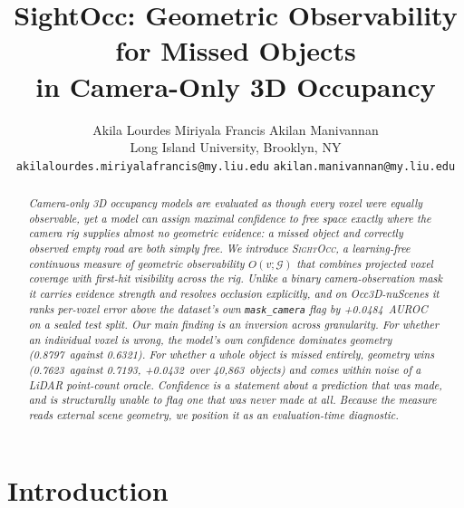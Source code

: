 \documentclass[10pt,twocolumn,letterpaper]{article}
\newcommand{\Hii}{+0.0484}
\newcommand{\objObs}{0.7623}
\newcommand{\objMSP}{0.7193}
\newcommand{\objDelta}{+0.0432}
\newcommand{\voxMSP}{0.8797}
\newcommand{\voxObs}{0.6321}
\newcommand{\nObj}{40{,}863}
\begin{document}
\title{SightOcc: Geometric Observability for Missed Objects\\
       in Camera-Only 3D Occupancy}

\author{%
Akila Lourdes Miriyala Francis \qquad Akilan Manivannan\\
Long Island University, Brooklyn, NY\\
{\tt\small akilalourdes.miriyalafrancis@my.liu.edu}\quad
{\tt\small akilan.manivannan@my.liu.edu}
}

\date{}
\maketitle

\begin{abstract}
\itshape
Camera-only 3D occupancy models are evaluated as though every voxel were
equally observable, yet a model can assign maximal confidence to free
space exactly where the camera rig supplies almost no geometric evidence:
a missed object and correctly observed empty road are both simply
\emph{free}. We introduce {\upshape\textsc{SightOcc}}, a learning-free continuous
measure of \emph{geometric observability} $O(v;\mathcal{G})$ that combines
projected voxel coverage with first-hit visibility across the rig. Unlike
a binary camera-observation mask it carries evidence \emph{strength} and
resolves occlusion explicitly, and on Occ3D-nuScenes it ranks per-voxel
error above the dataset's own \texttt{mask\_camera} flag by \Hii\ AUROC on
a sealed test split. Our main finding is an inversion across granularity.
For whether an individual voxel is wrong, the model's own confidence
dominates geometry (\voxMSP\ against \voxObs). For whether a whole
\emph{object} is missed entirely, geometry wins (\objObs\ against
\objMSP, \objDelta\ over \nObj\ objects) and comes within noise of a LiDAR
point-count oracle. Confidence is a statement about a prediction that was
made, and is structurally unable to flag one that was never made at all.
Because the measure reads external scene geometry, we position it as an
evaluation-time diagnostic.
\end{abstract}

\section{Introduction}
\end{document}
